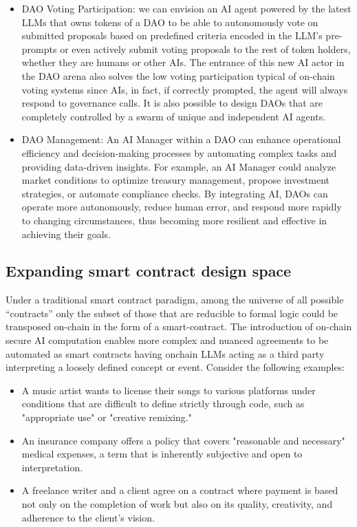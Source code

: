 \documentclass{article}
\begin{document}
\begin{itemize}


\item DAO Voting Participation: we can envision an AI agent powered by the latest LLMs that owns tokens of a DAO to be able to autonomously vote on submitted proposals based on predefined criteria encoded in the LLM’s pre-prompts or even actively submit voting proposals to the rest of token holders, whether they are humans or other AIs. The entrance of this new AI actor in the DAO arena also solves the low voting participation typical of on-chain voting systems since AIs, in fact, if correctly prompted, the agent will always respond to governance calls. It is also possible to design DAOs that are completely controlled by a swarm of unique and independent AI agents. 


\item DAO Management: An AI Manager within a DAO can enhance operational efficiency and decision-making processes by automating complex tasks and providing data-driven insights. For example, an AI Manager could analyze market conditions to optimize treasury management, propose investment strategies, or automate compliance checks.  By integrating AI, DAOs can operate more autonomously, reduce human error, and respond more rapidly to changing circumstances, thus becoming more resilient and effective in achieving their goals.

\end{itemize}

\subsection{Expanding smart contract design space}

Under a traditional smart contract paradigm, among the universe of all possible “contracts” only the subset of those that are reducible to formal logic could be transposed on-chain in the form of a smart-contract. The introduction of on-chain secure AI computation enables more complex and nuanced agreements to be automated as smart contracts having onchain LLMs acting as a third party interpreting a loosely defined concept or event.
Consider the following examples:

\begin{itemize}


\item A music artist wants to license their songs to various platforms under conditions that are difficult to define strictly through code, such as "appropriate use" or "creative remixing." 

\item An insurance company offers a policy that covers "reasonable and necessary" medical expenses, a term that is inherently subjective and open to interpretation.

\item A freelance writer and a client agree on a contract where payment is based not only on the completion of work but also on its quality, creativity, and adherence to the client's vision.

\end{itemize}
\end{document}

